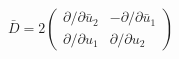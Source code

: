 \begin{equation}
\bar{D}=2 \left(
\begin{array}{cc}
\partial /\partial \bar{u}_{2} & -\partial / \partial \bar{u}_{1}  \\
\partial / \partial u_{1} & \partial / \partial u_{2}
\end{array}
\right)
\end{equation}

